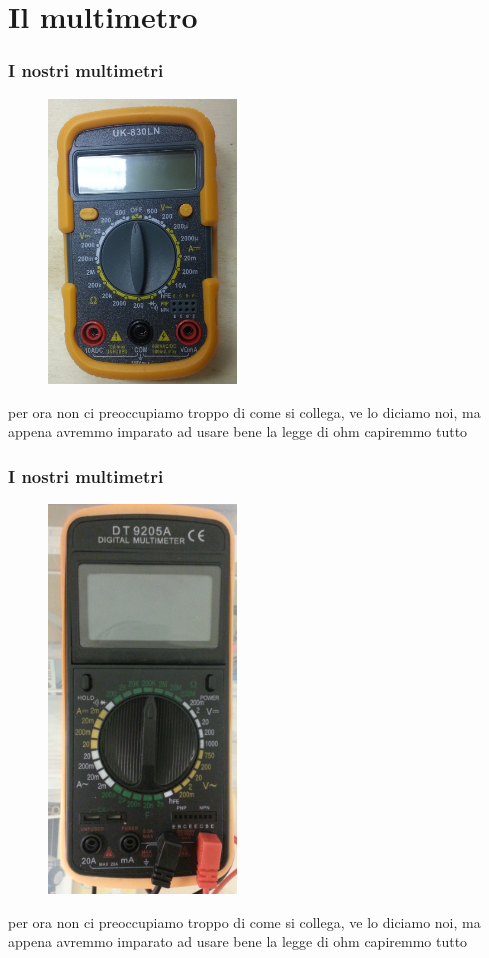 	\section{Il multimetro} %
	\label{sec:il_multimetro}
		\begin{frame}[c]\frametitle{I nostri multimetri}
		    
			\begin{figure}[tb]
				\centering
				\includegraphics[width= 5cm]{./img/M_small.jpg}
				\label{fig:figure3}
			\end{figure}

			per ora non ci preoccupiamo troppo di come si collega, ve lo diciamo noi, ma appena avremmo imparato ad usare bene la legge di ohm capiremmo tutto		
		\end{frame}

		\begin{frame}[c]\frametitle{I nostri multimetri}
		    
			\begin{figure}[tb]
				\centering
				\includegraphics[width= 5cm]{./img/M_big.jpg}
				\label{fig:figure3}
			\end{figure}

			per ora non ci preoccupiamo troppo di come si collega, ve lo diciamo noi, ma appena avremmo imparato ad usare bene la legge di ohm capiremmo tutto		
		\end{frame}

